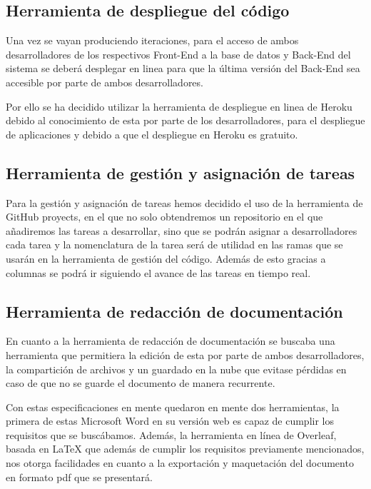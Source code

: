 \subsection{Herramienta de despliegue del código}

Una vez se vayan produciendo iteraciones, para el acceso de ambos desarrolladores de los respectivos Front-End a la base de datos y Back-End del sistema se deberá desplegar en linea para que la última versión del Back-End sea accesible por parte de ambos desarrolladores.

Por ello se ha decidido utilizar la herramienta de despliegue en linea de Heroku debido al conocimiento de esta por parte de los desarrolladores, para el despliegue de aplicaciones y debido a que el despliegue en Heroku es gratuito.

\subsection{Herramienta de gestión y asignación de tareas}

Para la gestión y asignación de tareas hemos decidido el uso de la herramienta de GitHub proyects, en el que no solo obtendremos un repositorio en el que añadiremos las tareas a desarrollar, sino que se podrán asignar a desarrolladores cada tarea y la nomenclatura de la tarea será de utilidad en las ramas que se usarán en la herramienta de gestión del código. Además de esto gracias a columnas se podrá ir siguiendo el avance de las tareas en tiempo real. 

\subsection{Herramienta de redacción de documentación}

En cuanto a la herramienta de redacción de documentación se buscaba una herramienta que permitiera la edición de esta por parte de ambos desarrolladores, la compartición de archivos y un guardado en la nube que evitase pérdidas en caso de que no se guarde el documento de manera recurrente. 

Con estas especificaciones en mente quedaron en mente dos herramientas, la primera de estas Microsoft Word en su versión web es capaz de cumplir los requisitos que se buscábamos. Además, la herramienta en línea de Overleaf, basada en LaTeX que además de cumplir los requisitos previamente mencionados, nos otorga facilidades en cuanto a la exportación y maquetación del documento en formato pdf que se presentará.

